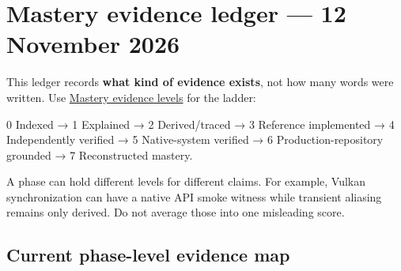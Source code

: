 \hypertarget{appendix-2358b21a702d}{}
\section{Mastery evidence ledger --- 12 November 2026}\label{appendix-2358b21a702d-mastery-evidence-ledger-12-november-2026}

This ledger records \textbf{what kind of evidence exists}, not how many words were written. Use \hyperref[appendix-2a2e5bd7143a]{Mastery evidence levels} for the ladder:

0 Indexed → 1 Explained → 2 Derived/traced → 3 Reference implemented → 4 Independently verified → 5 Native-system verified → 6 Production-repository grounded → 7 Reconstructed mastery.

A phase can hold different levels for different claims. For example, Vulkan synchronization can have a native API smoke witness while transient aliasing remains only derived. Do not average those into one misleading score.

\subsection{Current phase-level evidence map}\label{appendix-2358b21a702d-current-phase-level-evidence-map}

